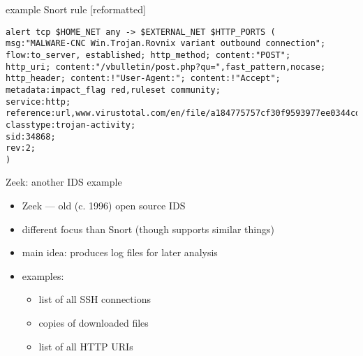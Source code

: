 \begin{frame}[fragile]{example Snort rule [reformatted]}
\begin{Verbatim}[fontsize=\small]
alert tcp $HOME_NET any -> $EXTERNAL_NET $HTTP_PORTS (
msg:"MALWARE-CNC Win.Trojan.Rovnix variant outbound connection";
flow:to_server, established; http_method; content:"POST";
http_uri; content:"/vbulletin/post.php?qu=",fast_pattern,nocase;
http_header; content:!"User-Agent:"; content:!"Accept";
metadata:impact_flag red,ruleset community;
service:http;
reference:url,www.virustotal.com/en/file/a184775757cf30f9593977ee0344cd6c54deb4b14a012a7af8e3a2cdbb85a749/analysis/;
classtype:trojan-activity;
sid:34868;
rev:2;
)
\end{Verbatim}
\end{frame}

\begin{frame}[fragile]{Zeek: another IDS example}
    \begin{itemize}
    \item Zeek --- old (c. 1996) open source IDS
    \item different focus than Snort (though supports similar things)
    \vspace{.5cm}
    \item main idea: produces log files for later analysis
    \item examples:
        \begin{itemize}
        \item list of all SSH connections
        \item copies of downloaded files
        \item list of all HTTP URIs
        \end{itemize}
    \end{itemize}
\end{frame}
